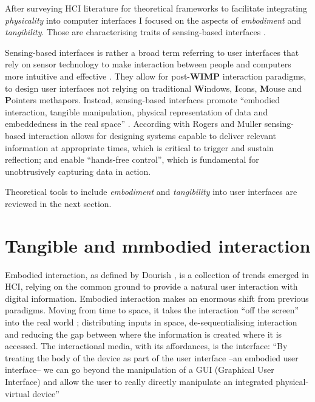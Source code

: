 After surveying HCI literature for theoretical frameworks to facilitate integrating \emph{physicality} into computer interfaces I focused on the aspects of \emph{embodiment} and \emph{tangibility}. Those are characterising traits of sensing-based interfaces \autocite{Benford:2005bo}.

Sensing-based interfaces is rather a broad term referring to user interfaces that rely on sensor technology to make interaction between people and computers more intuitive and effective \autocite{Zhai:2005jm}. They allow for post-\textbf{WIMP} \autocite{VanDam:1997tz} interaction paradigms, to design user interfaces not relying on traditional \textbf{W}indows, \textbf{I}cons, \textbf{M}ouse and \textbf{P}ointers methapors. Instead, sensing-based interfaces promote ``embodied interaction, tangible manipulation, physical representation of data and embeddedness in the real space'' \autocite{Hornecker:2006uq}. According with Rogers and Muller \autocite*{Rogers:2006te} sensing-based interaction allows for designing systems capable to deliver relevant information at appropriate times, which is critical to trigger and sustain reflection; and enable ``hands-free control'', which is fundamental for unobtrusively capturing data in action.

Theoretical tools to include \emph{embodiment} and \emph{tangibility} into user interfaces are reviewed in the next section.

\section{Tangible and mmbodied interaction}\label{tangible-interfaces-and-embodied-interaction}

Embodied interaction, as defined by Dourish \autocite{Dourish:2001vc}, is a collection of trends emerged in HCI, relying on the common ground to provide a natural user interaction with digital information. Embodied interaction makes an enormous shift from previous paradigms. Moving from time to space, it takes the interaction ``off the screen'' into the real world \autocite{Dourish:2001vc}; distributing inputs in space, de-sequentialising interaction and reducing the gap between where the information is created where it is accessed. The interactional media, with its affordances, is the interface: ``By treating the body of the device as part of the user interface --an embodied user interface-- we can go beyond the manipulation of a GUI (Graphical User Interface) and allow the user to really directly manipulate an integrated physical-virtual device'' \autocite{Fishkin:2000df}

